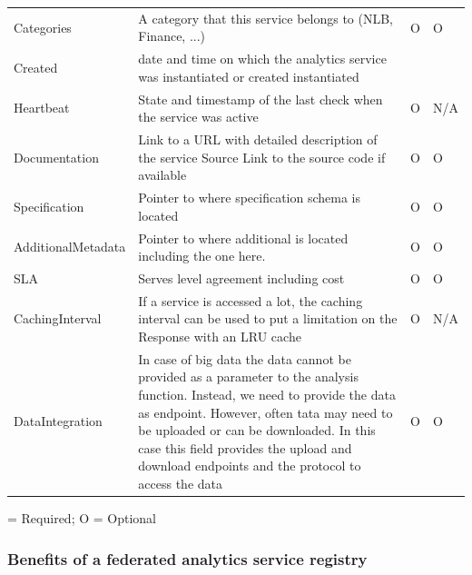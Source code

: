 \documentclass[12pt]{article}
\begin{document}
\begin{table}[H]
{\begin{tabular}{p{3cm}p{11cm}p{0.5cm}p{0.5cm}}
Categories &	A category that this service belongs to (NLB, Finance, ...)	& O & O \\
Created	& date and time on which the analytics service was instantiated or created	instantiated	& \OK & \OK \\
Heartbeat &	State and timestamp of the last check when the service was active	& O & 	N/A \\
Documentation &	Link to a URL with detailed description of the service
Source	Link to the source code if available	& O & O \\
Specification &	Pointer to where specification schema is located	& O &  O \\
AdditionalMetadata	& Pointer to where additional is located including the one here.	& O &	O \\
SLA	& Serves level agreement including cost	& O 	& O \\
CachingInterval	&If a service is accessed a lot, the caching interval can be used to put a limitation on the Response with an LRU cache	& O &	N/A \\
DataIntegration &	In case of big data the data cannot be provided as a parameter to the analysis function. Instead, we need to provide the data as endpoint. However, often tata may need to be uploaded or can be downloaded. In this case this field provides the upload and download endpoints and the protocol to access the data	& O &	O \\
\hline
\end{tabular}
}
\OK = Required; O = Optional
\end{table}

\subsubsection{Benefits of a federated analytics service registry}
\end{document}

